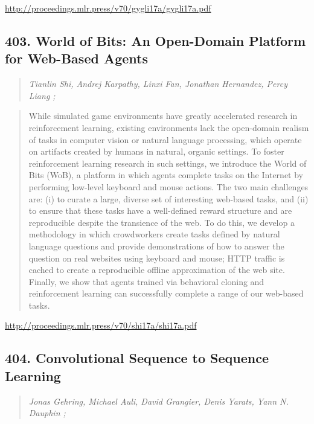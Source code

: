 \documentclass{article}
\begin{document}
\href{http://proceedings.mlr.press/v70/gygli17a/gygli17a.pdf}{http://proceedings.mlr.press/v70/gygli17a/gygli17a.pdf}

\subsection{403. World of Bits: An Open-Domain Platform for Web-Based Agents}

\begin{quote}
\footnotesize{\textit{Tianlin Shi, Andrej Karpathy, Linxi Fan, Jonathan Hernandez, Percy Liang ;}}

\end{quote}

\begin{quote}
    While simulated game environments have greatly accelerated research in reinforcement learning, existing environments lack the open-domain realism of tasks in computer vision or natural language processing, which operate on artifacts created by humans in natural, organic settings. To foster reinforcement learning research in such settings, we introduce the World of Bits (WoB), a platform in which agents complete tasks on the Internet by performing low-level keyboard and mouse actions. The two main challenges are: (i) to curate a large, diverse set of interesting web-based tasks, and (ii) to ensure that these tasks have a well-defined reward structure and are reproducible despite the transience of the web. To do this, we develop a methodology in which crowdworkers create tasks defined by natural language questions and provide demonstrations of how to answer the question on real websites using keyboard and mouse; HTTP traffic is cached to create a reproducible offline approximation of the web site. Finally, we show that agents trained via behavioral cloning and reinforcement learning can successfully complete a range of our web-based tasks.  
\end{quote}

\href{http://proceedings.mlr.press/v70/shi17a/shi17a.pdf}{http://proceedings.mlr.press/v70/shi17a/shi17a.pdf}

\subsection{404. Convolutional Sequence to Sequence Learning}

\begin{quote}
\footnotesize{\textit{Jonas Gehring, Michael Auli, David Grangier, Denis Yarats, Yann N. Dauphin ;}}

\end{quote}
\end{document}
